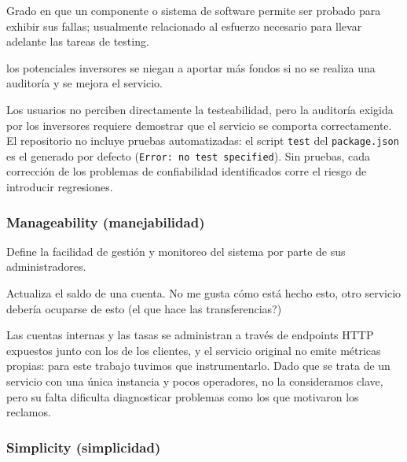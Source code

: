            Grado en que un componente o sistema de software permite ser probado para exhibir sus fallas; usualmente relacionado al esfuerzo necesario para llevar adelante las tareas de testing.

            \begin{customenv}[frametitle=]
                los potenciales inversores se niegan a aportar más fondos si no se realiza una auditoría y se mejora el servicio.
            \end{customenv}

            Los usuarios no perciben directamente la testeabilidad, pero la auditoría
            exigida por los inversores requiere demostrar que el servicio se comporta
            correctamente. El repositorio no incluye pruebas automatizadas: el script
            \texttt{test} del \texttt{package.json} es el generado por defecto
            (\texttt{Error: no test specified}). Sin pruebas, cada corrección de los
            problemas de confiabilidad identificados corre el riesgo de introducir
            regresiones.

        \subsubsection{Manageability (manejabilidad)}
        \label{sec:manejabilidad}

            Define la facilidad de gestión y monitoreo del sistema por parte de sus administradores.

            \begin{customenv}[frametitle=]
                Actualiza el saldo de una cuenta. No me gusta cómo está hecho esto, otro servicio debería ocuparse de esto (el que hace las transferencias?)
            \end{customenv}

            Las cuentas internas y las tasas se administran a través de endpoints HTTP
            expuestos junto con los de los clientes, y el servicio original no emite
            métricas propias: para este trabajo tuvimos que instrumentarlo. Dado que se
            trata de un servicio con una única instancia y pocos operadores, no la
            consideramos clave, pero su falta dificulta diagnosticar problemas como los
            que motivaron los reclamos.

        \subsubsection{Simplicity (simplicidad)}
        \label{sec:simplicidad}

